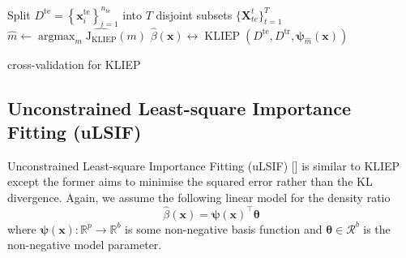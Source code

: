 \documentclass[a4paper,12pt]{article}
\begin{document}
\begin{algorithm}[H]
\SetAlgoLined
{}
 Split $D^{\mathrm{te}}=\left\{\boldsymbol{x}_{i}^{\mathrm{te}}\right\}_{i=1}^{n_{\mathrm{te}}}$ into $T$ disjoint subsets $\{\boldsymbol{X}_{te}^{t}\}_{t = 1}^{T}$\;
 $\hat{m} \longleftarrow \operatorname{argmax}_{m} \widehat{\mathrm{J_{KLIEP}}}(m)$ \;
 $\widehat{\beta}(\boldsymbol{x}) \longleftrightarrow \operatorname{KLIEP}\left(D^{\mathrm{te}}, D^{\mathrm{tr}}, \boldsymbol{\psi}_{\widehat{m}}(\boldsymbol{x})\right)$
\caption{cross-validation for KLIEP}
\end{algorithm}

%
%
%
%
%
%
\subsection{Unconstrained Least-square Importance Fitting (uLSIF)}
Unconstrained Least-square Importance Fitting (uLSIF) [\cite{yamada2013relative}] is similar to KLIEP except the former aims to minimise the squared error rather than the KL divergence. Again, we assume the following linear model for the density ratio 
\begin{equation*}
\hat{\beta}(\boldsymbol{x})=\boldsymbol{\psi}(\boldsymbol{x})^{\top} \boldsymbol{\theta}
\end{equation*}
where $\boldsymbol{\psi}(\boldsymbol{x}): \mathbb{R}^{p} \rightarrow \mathbb{R}^{b}$ is some non-negative basis function and $\boldsymbol{\theta} \in \mathcal{R}^{b}$ is the non-negative model parameter.
\end{document}

